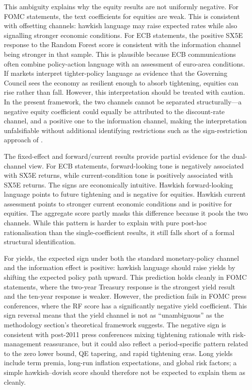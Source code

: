 This ambiguity explains why the equity results are not uniformly negative. For
FOMC statements, the text coefficients for equities are weak. This is consistent
with offsetting channels: hawkish language may raise expected rates while also
signalling stronger economic conditions. For ECB statements, the positive SX5E
response to the Random Forest score is consistent with the information channel
being stronger in that sample. This is plausible because ECB communications
often combine policy-action language with an assessment of euro-area conditions.
If markets interpret tighter-policy language as evidence that the Governing
Council sees the economy as resilient enough to absorb tightening, equities can
rise rather than fall. However, this interpretation should be treated with
caution. In the present framework, the two channels cannot be separated
structurally---a negative equity coefficient could equally be attributed to the
discount-rate channel, and a positive one to the information channel, making the
interpretation unfalsifiable without additional identifying restrictions such as
the sign-restriction approach of \citet{jarocinski2020}.

The fixed-effect and forward/current results provide partial evidence for the
dual-channel view. For ECB statements, forward-looking tone is negatively
associated with SX5E returns, while current-condition tone is positively
associated with SX5E returns. The signs are economically intuitive. Hawkish
forward-looking language points to future tightening and is negative for
equities. Hawkish current assessment points to stronger current economic
conditions and is positive for equities. The aggregate score partly masks this
difference because it pools the two channels. While this pattern is harder to
explain with pure post-hoc rationalisation than the single-coefficient results,
it still falls short of a formal structural identification.

For yields, the expected sign under both the standard monetary-policy channel
and the information effect is positive: hawkish language should raise yields by
shifting the expected policy path upward. This prediction holds cleanly in FOMC
statements, where the two-year Treasury response is the strongest yield result
and the ten-year response is weaker. However, the prediction fails in FOMC press
conferences, where the RF score has a significantly negative yield coefficient.
This sign reversal means that the yield channel is not as ``unambiguous'' as the
methodology section's theoretical framework suggests. The negative sign is
consistent with post-2011 press conferences mixing tightening rationale with
risk-management reassurance, but it could also reflect a period-specific pattern
related to the zero lower bound, QE tapering, and rapid tightening eras. Long
yields include term premia, long-run inflation expectations, and global risk
factors; a simple hawkish--dovish score should therefore not be expected to
explain them as cleanly.


